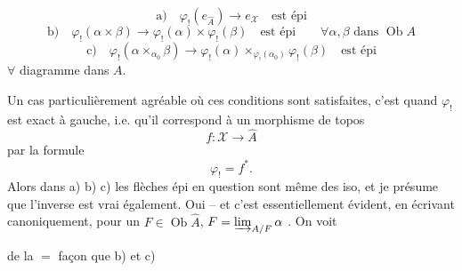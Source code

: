 
\[
\text{a)}\quad \varphi_!(e_{\widehat A})\longrightarrow e_{\mathcal X}\quad\text{est épi}
\]
\[
\text{b)}\quad \varphi_!(\alpha\times\beta)\longrightarrow
\varphi_!(\alpha)\times\varphi_!(\beta)\quad\text{est épi}
\qquad \forall\alpha,\beta\text{ dans }\operatorname{Ob}A
\]
\[
\text{c)}\quad \varphi_!(\alpha\times_{\alpha_0}\beta)\longrightarrow
\varphi_!(\alpha)\times_{\varphi_!(\alpha_0)}\varphi_!(\beta)\quad\text{est épi}
\]
$\forall$ diagramme
dans $A$.

Un cas particulièrement agréable où ces conditions sont satisfaites, c'est quand $\varphi_!$ est exact à gauche, i.e. qu'il correspond  à un morphisme de topos
\[
f:\mathcal X\longrightarrow\widehat A
\]
par la formule
\[
\varphi_!=f^*.
\]
Alors dans a) b) c) les flèches épi en question sont même des iso, et je présume que l'inverse est vrai également. Oui -- et c'est essentiellement évident, en écrivant canoniquement, pour un $F\in\operatorname{Ob}\widehat A$, $F=\varinjlim_{A/F}\alpha$ \unsure{$\ldots$}. On voit


de la $=$ façon que b) et c)

